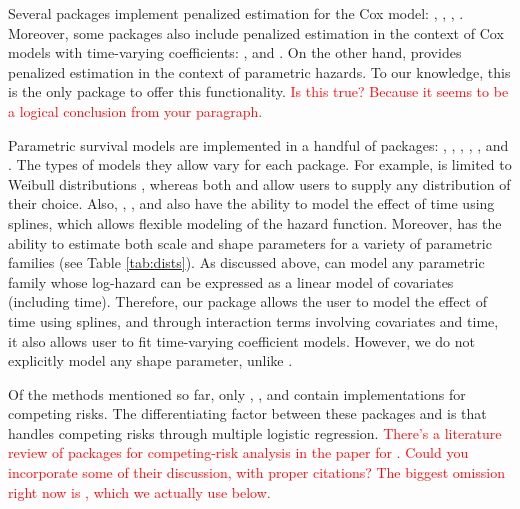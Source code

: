 \documentclass[
]{jss}
\begin{document}
Several packages implement penalized estimation for the Cox model:
 \citeyearpar{regpathcox}, 
\citeyearpar{park_hastie},  \citeyearpar{l1penal},
 \citeyearpar{gerds_blanche}. Moreover, some
packages also include penalized estimation in the context of Cox models
with time-varying coefficients: 
\citeyearpar{perperoglou},  \citeyearpar{clements_liu} and
 \citeyearpar{survival-package}. On the other hand,
 provides penalized estimation in the context of
parametric hazards. To our knowledge, this is the only package to offer
this functionality.
\textcolor{red}{Is this true? Because it seems to be a logical conclusion from your paragraph.}

Parametric survival models are implemented in a handful of packages:
 \citeyearpar{sharabiani_mahani_2019}, 
\citeyearpar{flexsurv},  \citeyearpar{smoothHazard},
 \citeyearpar{clements_liu}, 
\citeyearpar{scheike2014estimating}, and . The types of
models they allow vary for each package. For example, 
is limited to Weibull distributions \citeyearpar{smoothHazard}, whereas
both  and  allow users to supply any
distribution of their choice. Also, , ,
 and  also have the ability to model the effect of
time using splines, which allows flexible modeling of the hazard
function. Moreover,  has the ability to estimate both
scale and shape parameters for a variety of parametric families (see
Table \ref{tab:dists}). As discussed above,  can model any
parametric family whose log-hazard can be expressed as a linear model of
covariates (including time). Therefore, our package allows the user to
model the effect of time using splines, and through interaction terms
involving covariates and time, it also allows user to fit time-varying
coefficient models. However, we do not explicitly model any shape
parameter, unlike .

Of the methods mentioned so far, only , ,
 and  contain implementations for competing
risks. The differentiating factor between these packages and
 is that  handles competing risks through
multiple logistic regression.
\textcolor{red}{There's a literature review of packages for competing-risk analysis in the paper for . Could you incorporate some of their discussion, with proper citations? The biggest omission right now is , which we actually use below.}
\end{document}
